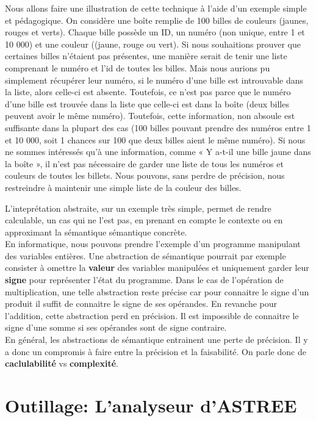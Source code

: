 \documentclass[french]{article}
\begin{document}
Nous allons faire une illustration de cette technique à l'aide d'un exemple simple et pédagogique. On considère une boîte remplie de 100 billes de couleurs (jaunes, rouges et verts).
Chaque bille possède un ID, un numéro (non unique, entre 1 et 10 000)
et une couleur ((jaune, rouge ou vert).
Si nous souhaitions prouver que certaines billes n'étaient pas présentes, une manière serait
de tenir une liste comprenant le numéro et l'id de toutes les billes.
Mais nous aurions pu simplement récupérer leur numéro, si le numéro d'une bille est introuvable dans la liste,
alors celle-ci est absente. Toutefois, ce n'est pas parce que le numéro d'une bille est
trouvée dans la liste que celle-ci est dans la boîte (deux billes peuvent avoir le
même numéro). Toutefois, cette information, non absoule est suffisante dans la plupart
des cas (100 billes pouvant prendre des numéros entre 1 et 10 000, soit 1 chances sur 100 que deux billes aient
le même numéro).
Si nous ne sommes intéressés qu'à une information,
comme « Y a-t-il une bille jaune dans la boîte », il n'est
pas nécessaire de garder une liste de tous les numéros et couleurs de toutes les billets.
Nous pouvons, sans perdre de précision, nous
restreindre à maintenir une simple liste de la couleur des billes.

L'inteprétation abstraite, sur un exemple très simple, permet de rendre calculable, un cas qui ne l'est pas,
en prenant en compte le contexte ou en approximant la sémantique sémantique concrète. \\

En informatique, nous pouvons prendre l'exemple d'un programme manipulant des variables entières. Une abstraction de sémantique pourrait par exemple consister à omettre la \textbf{valeur} des variables manipulées et uniquement garder leur \textbf{signe} pour représenter l'état du programme. Dans le cas de l'opération de multiplication, une telle abstraction reste précise car pour connaitre le signe d'un produit il suffit de connaitre le signe de ses opérandes. En revanche pour l'addition, cette abstraction perd en précision. Il est impossible de connaitre le signe d'une somme si ses opérandes sont de signe contraire.\\

En général, les abstractions de sémantique entrainent une perte de précision. Il y a donc un compromis à faire entre la précision et la faisabilité. On parle donc de \textbf{caclulabilité} vs \textbf{complexité}.


\section{Outillage: L'analyseur d'ASTREE}
\end{document}

